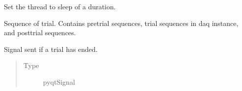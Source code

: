 \documentclass[letterpaper,10pt,english]{sphinxmanual}
\begin{document}
\begin{fulllineitems}
\begin{fulllineitems}
\begin{quote}
\begin{description}
\begin{itemize}
\end{itemize}

\end{description}\end{quote}

\end{fulllineitems}


\begin{fulllineitems}
\label{\detokenize{NoSeMazeController/Controllers:Controllers.ExperimentControl.ExperimentWorker.timeout}}
\pysigstartsignatures
{}
\pysigstopsignatures
\sphinxAtStartPar
Set the thread to sleep of a duration.

\end{fulllineitems}


\begin{fulllineitems}
\label{\detokenize{NoSeMazeController/Controllers:Controllers.ExperimentControl.ExperimentWorker.trial}}
\pysigstartsignatures
{}
\pysigstopsignatures
\sphinxAtStartPar
Sequence of trial. Contains pre\sphinxhyphen{}trial sequences, trial sequences in
daq instance, and post\sphinxhyphen{}trial sequences.

\end{fulllineitems}


\begin{fulllineitems}
\label{\detokenize{NoSeMazeController/Controllers:Controllers.ExperimentControl.ExperimentWorker.trial_end}}
\pysigstartsignatures
{}
\pysigstopsignatures
\sphinxAtStartPar
Signal sent if a trial has ended.
\begin{quote}\begin{description}
\item[{Type}] \leavevmode
\sphinxAtStartPar
pyqtSignal

\end{description}\end{quote}

\end{fulllineitems}


\end{fulllineitems}
\end{document}
